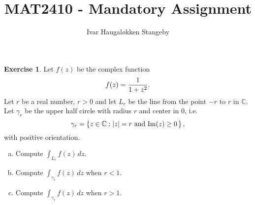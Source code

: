 \documentclass[a4paper, 10pt]{amsart}
\title{ MAT2410 - Mandatory Assignment }
\author{Ivar Haugal\o kken Stangeby}
\theoremstyle{definition}
\newtheorem{exrc}{Exercise}
\renewcommand{\Im}[1]{ \mathrm{Im}(#1) }
\begin{document}
\maketitle
\begin{exrc}
  Let $f(z)$ be the complex function
  \begin{equation}
    \notag
    f(z) = \frac{1}{1+z^2}.
  \end{equation}
  Let $r$ be a real number, $r > 0$ and let $L_r$ be the line from the point $-r$ to $r$ in $\mathbb{C}$. Let $\gamma_r$ be the upper half circle with radius $r$ and center in 0, i.e.
  \begin{equation}
    \notag
    \gamma_r = \left\{ z \in \mathbb{C} : |z| = r \text{ and } \Im{z} \geq 0 \, \right\},
  \end{equation}
  with positive orientation.
  \begin{enumerate}[a)]
    \item Compute $\int_{L_r} f(z) \, dz$.
    \item Compute $\int_{\gamma_r} f(z) \, dz$ when $r < 1$.
    \item Compute $\int_{\gamma_r} f(z) \, dz$ when $r > 1$.
  \end{enumerate}
\end{exrc}
\end{document}
